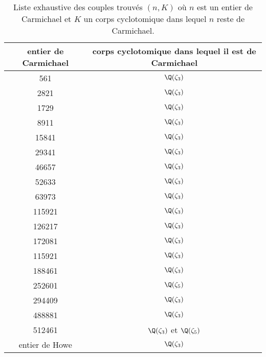 \begin{table}[H]
	\begin{center}
		\begin{tabular}{|c|c|}
			\hline
			entier de Carmichael & corps cyclotomique dans lequel il est de Carmichael \\
			\hline
			\hline
			561				& $\Q(\zeta_3)$ \\\hline
			2821			& $\Q(\zeta_3)$ \\\hline
			1729			& $\Q(\zeta_3)$ \\\hline
			8911			& $\Q(\zeta_3)$ \\\hline
			15841			& $\Q(\zeta_3)$ \\\hline
			29341			& $\Q(\zeta_3)$ \\\hline
			46657			& $\Q(\zeta_3)$ \\\hline
			52633			& $\Q(\zeta_3)$ \\\hline
			63973			& $\Q(\zeta_3)$ \\\hline
			115921			& $\Q(\zeta_3)$ \\\hline
			126217			& $\Q(\zeta_3)$ \\\hline
			172081			& $\Q(\zeta_3)$ \\\hline
			115921			& $\Q(\zeta_3)$ \\\hline
			188461			& $\Q(\zeta_3)$ \\\hline
			252601			& $\Q(\zeta_5)$ \\\hline
			294409			& $\Q(\zeta_3)$ \\\hline
			488881			& $\Q(\zeta_3)$ \\\hline
			512461			& $\Q(\zeta_3)$ et $\Q(\zeta_5)$ \\\hline
			entier de Howe	& $\Q(\zeta_3)$ \\\hline
		\end{tabular}
	\end{center}
	\caption{Liste exhaustive des couples trouvés $(n, K)$ où $n$ est un entier de Carmichael et $K$ un corps cyclotomique dans lequel $n$ reste de Carmichael.}
\end{table}

